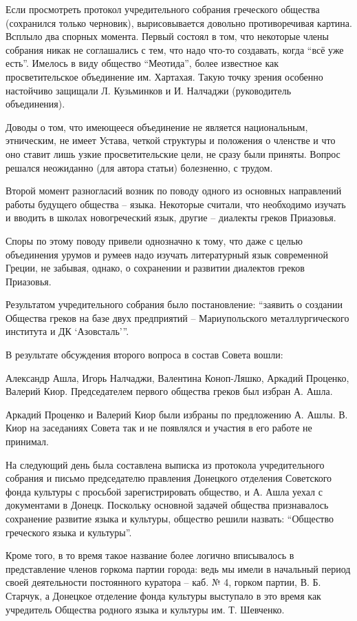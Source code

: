 Если просмотреть протокол учредительного собрания греческого общества
(сохранился только черновик), вырисовывается довольно противоречивая картина.
Всплыло два спорных момента. Первый состоял в том, что некоторые члены собрания
никак не соглашались с тем, что надо что-то создавать, когда \enquote{всё уже есть}.
Имелось в виду общество \enquote{Меотида}, более известное как просветительское
объединение им. Хартахая. Такую точку зрения особенно настойчиво защищали
Л. Кузьминков и И. Налчаджи (руководитель объединения). 

Доводы о том, что имеющееся объединение не является национальным, этническим,
не имеет Устава, четкой структуры и положения о членстве и что оно ставит лишь
узкие просветительские цели, не сразу были приняты. Вопрос решался неожиданно
(для автора статьи) болезненно, с трудом.

Второй момент разногласий возник по поводу одного из основных направлений
работы будущего общества – языка. Некоторые считали, что необходимо изучать и
вводить в школах новогреческий язык, другие – диалекты греков Приазовья. 

Споры по этому поводу привели однозначно к тому, что даже с целью объединения
урумов и румеев надо изучать литературный язык современной Греции, не забывая,
однако, о сохранении и развитии диалектов греков Приазовья.

Результатом учредительного собрания было постановление: \enquote{заявить о создании
Общества греков на базе двух предприятий – Мариупольского металлургического
института и ДК \enquote{Азовсталь}}.

В результате обсуждения второго вопроса в состав Совета вошли: 

Александр Ашла, Игорь Налчаджи, Валентина Коноп-Ляшко, Аркадий Проценко,
Валерий Киор. Председателем первого общества греков был избран А. Ашла.

Аркадий Проценко и Валерий Киор были избраны по предложению А. Ашлы. В. Киор на
заседаниях Совета так и не появлялся и участия в его работе не принимал.

На следующий день была составлена выписка из протокола учредительного собрания
и письмо председателю правления Донецкого отделения Советского фонда культуры с
просьбой зарегистрировать общество, и А. Ашла уехал с документами в Донецк.
Поскольку основной задачей общества признавалось сохранение развитие языка и
культуры, общество решили назвать: \enquote{Общество греческого языка и культуры}. 

Кроме того, в то время такое название более логично вписывалось в представление
членов горкома партии города: ведь мы имели в начальный период своей
деятельности постоянного куратора – каб. № 4, горком партии, В. Б. Старчук, а
Донецкое отделение фонда культуры выступало в это время как учредитель Общества
родного языка и культуры им. Т. Шевченко. 


